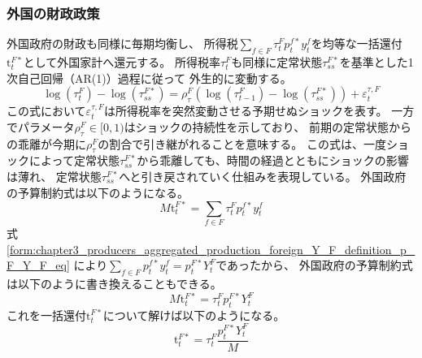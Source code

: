 \subsubsection{外国の財政政策}
\label{sec:chapter3_policies_fiscal_foreign}
外国政府の財政も同様に毎期均衡し、
所得税\(\sum_{f\in F}\tau_t^Fp_t^{f*}y_t^f\)を均等な一括還付\(\mathrm{t}_t^{F*}\)として外国家計へ還元する。
所得税率\(\tau_t^F\)も同様に定常状態\(\tau_{ss}^{F*}\)を基準とした1次自己回帰（AR(1)）過程に従って
外生的に変動する。
\begin{equation}
\label{form:chapter3_policies_fiscal_foreign_tau_eq}
    \log(\tau_t^F)-\log(\tau_{ss}^{F*})=\rho_{\tau}^F\left(\log(\tau_{t-1}^F)-\log(\tau_{ss}^{F*})\right)+\varepsilon_t^{\tau,F}
\end{equation}
この式において\(\varepsilon_t^{\tau,F}\)は所得税率を突然変動させる予期せぬショックを表す。
一方でパラメータ\(\rho_{\tau}^F \in [0,1)\)はショックの持続性を示しており、
前期の定常状態からの乖離が今期に\(\rho_{\tau}^F\)の割合で引き継がれることを意味する。
この式は、一度ショックによって定常状態\(\tau_{ss}^{F*}\)から乖離しても、時間の経過とともにショックの影響は薄れ、
定常状態\(\tau_{ss}^{F*}\)へと引き戻されていく仕組みを表現している。
外国政府の予算制約式は以下のようになる。
\begin{equation}
\label{form:chapter3_policies_fiscal_foreign_budget_eq}
    M\mathrm{t}_t^{F*}=\sum_{f\in F}\tau_t^Fp_t^{f*}y_t^f
\end{equation}
式
\eqref{form:chapter3_producers_aggregated_production_foreign_Y_F_definition_p_F_Y_F_eq}
により\(\sum_{f\in F}p_t^{f*}y_t^f=p_t^{F*}Y_t^F\)であったから、
外国政府の予算制約式は以下のように書き換えることもできる。
\begin{equation}
\label{form:chapter3_policies_fiscal_foreign_budget_modified_eq}
    M\mathrm{t}_t^{F*}=\tau_t^Fp_t^{F*}Y_t^F
\end{equation}
これを一括還付\(\mathrm{t}_t^{F*}\)について解けば以下のようになる。
\begin{equation}
\label{form:chapter3_policies_fiscal_foreign_budget_modified2_eq}
    \mathrm{t}_t^{F*}=\tau_t^F\frac{p_t^{F*}Y_t^F}{M}
\end{equation}
